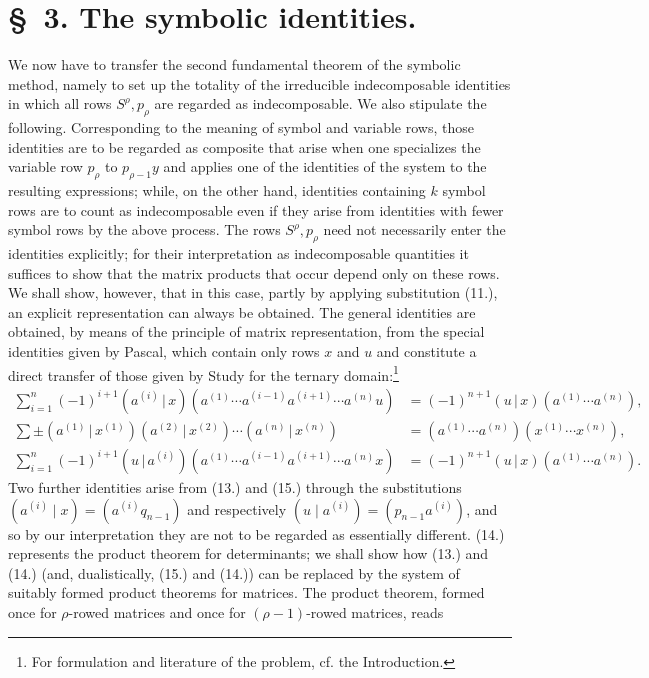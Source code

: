 \documentclass[11pt]{article}
\providecommand{\pair}[2]{(#1\,|\,#2)}
\begin{document}
\section*{\S\ 3. The symbolic identities.}
We now have to transfer the second fundamental theorem of the symbolic method, namely to set up the totality of the irreducible indecomposable identities in which all rows $S^\rho,p_\rho$ are regarded as indecomposable. We also stipulate the following. Corresponding to the meaning of symbol and variable rows, those identities are to be regarded as composite that arise when one specializes the variable row $p_\rho$ to $p_{\rho-1}y$ and applies one of the identities of the system to the resulting expressions; while, on the other hand, identities containing $k$ symbol rows are to count as indecomposable even if they arise from identities with fewer symbol rows by the above process. The rows $S^\rho,p_\rho$ need not necessarily enter the identities explicitly; for their interpretation as indecomposable quantities it suffices to show that the matrix products that occur depend only on these rows. We shall show, however, that in this case, partly by applying substitution (11.), an explicit representation can always be obtained. The general identities are obtained, by means of the principle of matrix representation, from the special identities given by Pascal, which contain only rows $x$ and $u$ and constitute a direct transfer of those given by Study for the ternary domain:\footnote{For formulation and literature of the problem, cf. the Introduction.}
\begin{align}
\sum_{i=1}^n(-1)^{i+1}\pair{a^{(i)}}{x}(a^{(1)}\cdots a^{(i-1)}a^{(i+1)}\cdots a^{(n)}u)&=(-1)^{n+1}\pair{u}{x}(a^{(1)}\cdots a^{(n)}),\tag{13}\\
\sum\pm\pair{a^{(1)}}{x^{(1)}}\pair{a^{(2)}}{x^{(2)}}\cdots\pair{a^{(n)}}{x^{(n)}}&=(a^{(1)}\cdots a^{(n)})(x^{(1)}\cdots x^{(n)}),\tag{14}\\
\sum_{i=1}^n(-1)^{i+1}\pair{u}{a^{(i)}}(a^{(1)}\cdots a^{(i-1)}a^{(i+1)}\cdots a^{(n)}x)&=(-1)^{n+1}\pair{u}{x}(a^{(1)}\cdots a^{(n)}).\tag{15}
\end{align}
Two further identities arise from (13.) and (15.) through the substitutions $(a^{(i)}\mid x)=(a^{(i)}q_{n-1})$ and respectively $(u\mid a^{(i)})=(p_{n-1}a^{(i)})$, and so by our interpretation they are not to be regarded as essentially different. (14.) represents the product theorem for determinants; we shall show how (13.) and (14.) (and, dualistically, (15.) and (14.)) can be replaced by the system of suitably formed product theorems for matrices. The product theorem, formed once for $\rho$-rowed matrices and once for $(\rho-1)$-rowed matrices, reads
\end{document}

